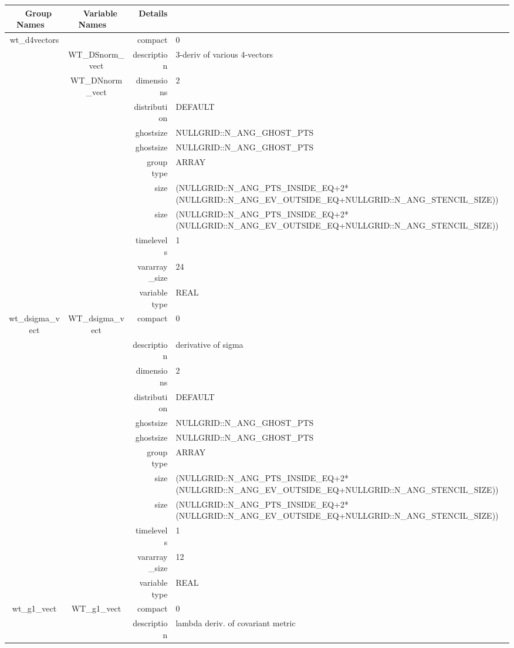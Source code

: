 \begin{tabular*}{150mm}{|c|c@{\extracolsep{\fill}}|rl|} \hline 
~ {\bf Group Names} ~ & ~ {\bf Variable Names} ~  &{\bf Details} ~ & ~ \\ 
\hline 
wt\_d4vectors &  & compact & 0 \\ 
 & WT\_DSnorm\_vect & description & 3-deriv of various 4-vectors \\ 
 & WT\_DNnorm\_vect & dimensions & 2 \\ 
 &  & distribution & DEFAULT \\ 
 &  & ghostsize & NULLGRID::N\_ANG\_GHOST\_PTS \\ 
& ~ & ghostsize & NULLGRID::N\_ANG\_GHOST\_PTS \\ 
 &  & group type & ARRAY \\ 
 &  & size & (NULLGRID::N\_ANG\_PTS\_INSIDE\_EQ+2*(NULLGRID::N\_ANG\_EV\_OUTSIDE\_EQ+NULLGRID::N\_ANG\_STENCIL\_SIZE)) \\ 
& ~ & size & (NULLGRID::N\_ANG\_PTS\_INSIDE\_EQ+2*(NULLGRID::N\_ANG\_EV\_OUTSIDE\_EQ+NULLGRID::N\_ANG\_STENCIL\_SIZE)) \\ 
 &  & timelevels & 1 \\ 
 &  & vararray\_size & 24 \\ 
 &  & variable type & REAL \\ 
\hline 
wt\_dsigma\_vect & WT\_dsigma\_vect & compact & 0 \\ 
 &  & description & derivative of sigma \\ 
 &  & dimensions & 2 \\ 
 &  & distribution & DEFAULT \\ 
 &  & ghostsize & NULLGRID::N\_ANG\_GHOST\_PTS \\ 
& ~ & ghostsize & NULLGRID::N\_ANG\_GHOST\_PTS \\ 
 &  & group type & ARRAY \\ 
 &  & size & (NULLGRID::N\_ANG\_PTS\_INSIDE\_EQ+2*(NULLGRID::N\_ANG\_EV\_OUTSIDE\_EQ+NULLGRID::N\_ANG\_STENCIL\_SIZE)) \\ 
& ~ & size & (NULLGRID::N\_ANG\_PTS\_INSIDE\_EQ+2*(NULLGRID::N\_ANG\_EV\_OUTSIDE\_EQ+NULLGRID::N\_ANG\_STENCIL\_SIZE)) \\ 
 &  & timelevels & 1 \\ 
 &  & vararray\_size & 12 \\ 
 &  & variable type & REAL \\ 
\hline 
wt\_g1\_vect & WT\_g1\_vect & compact & 0 \\ 
 &  & description & lambda deriv. of covariant metric \\ 

\end{tabular*}
